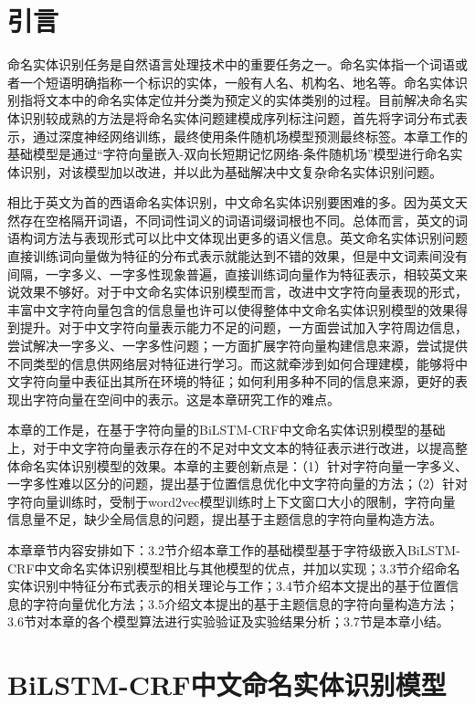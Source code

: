 \documentclass[winfonts,master,oneside,nobackinfo]{njuthesis}
\begin{document}
\section{引言}

命名实体识别任务是自然语言处理技术中的重要任务之一。命名实体指一个词语或者一个短语明确指称一个标识的实体，一般有人名、机构名、地名等。命名实体识别指将文本中的命名实体定位并分类为预定义的实体类别的过程。目前解决命名实体识别较成熟的方法是将命名实体问题建模成序列标注问题，首先将字词分布式表示，通过深度神经网络训练，最终使用条件随机场模型预测最终标签。本章工作的基础模型是通过“字符向量嵌入-双向长短期记忆网络-条件随机场”模型进行命名实体识别，对该模型加以改进，并以此为基础解决中文复杂命名实体识别问题。

相比于英文为首的西语命名实体识别，中文命名实体识别要困难的多。因为英文天然存在空格隔开词语，不同词性词义的词语词缀词根也不同。总体而言，英文的词语构词方法与表现形式可以比中文体现出更多的语义信息。英文命名实体识别问题直接训练词向量做为特征的分布式表示就能达到不错的效果，但是中文词素间没有间隔，一字多义、一字多性现象普遍，直接训练词向量作为特征表示，相较英文来说效果不够好。对于中文命名实体识别模型而言，改进中文字符向量表现的形式，丰富中文字符向量包含的信息量也许可以使得整体中文命名实体识别模型的效果得到提升。对于中文字符向量表示能力不足的问题，一方面尝试加入字符周边信息，尝试解决一字多义、一字多性问题；一方面扩展字符向量构建信息来源，尝试提供不同类型的信息供网络层对特征进行学习。而这就牵涉到如何合理建模，能够将中文字符向量中表征出其所在环境的特征；如何利用多种不同的信息来源，更好的表现出字符向量在空间中的表示。这是本章研究工作的难点。

本章的工作是，在基于字符向量的BiLSTM-CRF中文命名实体识别模型的基础上，对于中文字符向量表示存在的不足对中文文本的特征表示进行改进，以提高整体命名实体识别模型的效果。本章的主要创新点是：（1）针对字符向量一字多义、一字多性难以区分的问题，提出基于位置信息优化中文字符向量的方法；（2）针对字符向量训练时，受制于word2vec模型训练时上下文窗口大小的限制，字符向量信息量不足，缺少全局信息的问题，提出基于主题信息的字符向量构造方法。

本章章节内容安排如下：3.2节介绍本章工作的基础模型基于字符级嵌入BiLSTM-CRF中文命名实体识别模型相比与其他模型的优点，并加以实现；3.3节介绍命名实体识别中特征分布式表示的相关理论与工作；3.4节介绍本文提出的基于位置信息的字符向量优化方法；3.5介绍文本提出的基于主题信息的字符向量构造方法；3.6节对本章的各个模型算法进行实验验证及实验结果分析；3.7节是本章小结。

\section{BiLSTM-CRF中文命名实体识别模型}
\end{document}
